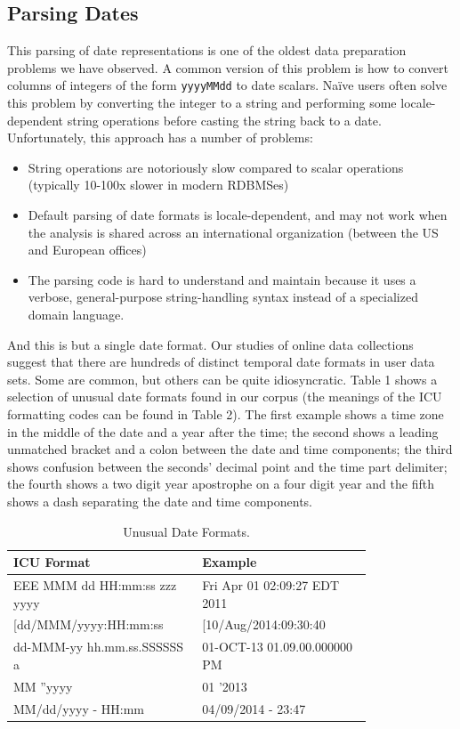 \subsection{Parsing Dates}
This parsing of date representations is one of the oldest data preparation problems we have observed. A common version of this problem is how to convert columns of integers of the form \texttt{yyyyMMdd} to date scalars. Na\"{i}ve users often solve this problem by converting the integer to a string and performing some locale-dependent string operations before casting the string back to a date. Unfortunately, this approach has a number of problems:
\begin{itemize}
\item String operations are notoriously slow compared to scalar operations (typically 10-100x slower in modern RDBMSes)
\item Default parsing of date formats is locale-dependent, and may not work when the analysis is shared across an international organization (\eg between the US and European offices)
\item The parsing code is hard to understand and maintain because it uses a verbose, general-purpose string-handling syntax instead of a specialized domain language.
\end{itemize}

And this is but a single date format. Our studies of online data collections suggest that there are hundreds of distinct temporal date formats in user data sets. Some are common, but others can be quite idiosyncratic. Table 1 shows a selection of unusual date formats found in our corpus (the meanings of the ICU formatting codes can be found in Table 2). The first example shows a time zone in the middle of the date and a year after the time; the second shows a leading unmatched bracket and a colon between the date and time components; the third shows confusion between the seconds' decimal point and the time part delimiter; the fourth shows a two digit year apostrophe on a four digit year and the fifth shows a dash separating the date and time components.

\begin{table}[ht]
\centering
\bgroup
\def\arraystretch{1.5}
\begin{tabular}{|p{0.4\linewidth}| p{0.4\linewidth}|}
\hline
\centering
\textbf{ICU Format} & \textbf{Example}\\ \hline
\scriptsize{EEE MMM dd HH:mm:ss zzz yyyy} & \scriptsize{Fri Apr 01 02:09:27 EDT 2011}\\ \hline
\scriptsize{[dd/MMM/yyyy:HH:mm:ss} & \scriptsize{[10/Aug/2014:09:30:40}\\ \hline
\scriptsize{dd-MMM-yy hh.mm.ss.SSSSSS a} & \scriptsize{01-OCT-13 01.09.00.000000 PM}\\ \hline
\scriptsize{MM ''yyyy} & \scriptsize{01 '2013}\\ \hline
\scriptsize{MM/dd/yyyy - HH:mm} & \scriptsize{04/09/2014 - 23:47}\\ \hline
\end{tabular}
\egroup
\label{tab:dateformats}
\caption{Unusual Date Formats.}
\end{table}

